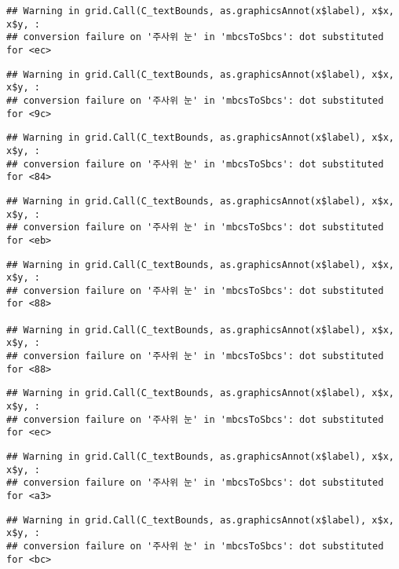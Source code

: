 \documentclass[]{book}
\begin{document}
\begin{verbatim}
## Warning in grid.Call(C_textBounds, as.graphicsAnnot(x$label), x$x, x$y, :
## conversion failure on '주사위 눈' in 'mbcsToSbcs': dot substituted for <ec>
\end{verbatim}

\begin{verbatim}
## Warning in grid.Call(C_textBounds, as.graphicsAnnot(x$label), x$x, x$y, :
## conversion failure on '주사위 눈' in 'mbcsToSbcs': dot substituted for <9c>
\end{verbatim}

\begin{verbatim}
## Warning in grid.Call(C_textBounds, as.graphicsAnnot(x$label), x$x, x$y, :
## conversion failure on '주사위 눈' in 'mbcsToSbcs': dot substituted for <84>
\end{verbatim}

\begin{verbatim}
## Warning in grid.Call(C_textBounds, as.graphicsAnnot(x$label), x$x, x$y, :
## conversion failure on '주사위 눈' in 'mbcsToSbcs': dot substituted for <eb>
\end{verbatim}

\begin{verbatim}
## Warning in grid.Call(C_textBounds, as.graphicsAnnot(x$label), x$x, x$y, :
## conversion failure on '주사위 눈' in 'mbcsToSbcs': dot substituted for <88>

## Warning in grid.Call(C_textBounds, as.graphicsAnnot(x$label), x$x, x$y, :
## conversion failure on '주사위 눈' in 'mbcsToSbcs': dot substituted for <88>
\end{verbatim}

\begin{verbatim}
## Warning in grid.Call(C_textBounds, as.graphicsAnnot(x$label), x$x, x$y, :
## conversion failure on '주사위 눈' in 'mbcsToSbcs': dot substituted for <ec>
\end{verbatim}

\begin{verbatim}
## Warning in grid.Call(C_textBounds, as.graphicsAnnot(x$label), x$x, x$y, :
## conversion failure on '주사위 눈' in 'mbcsToSbcs': dot substituted for <a3>
\end{verbatim}

\begin{verbatim}
## Warning in grid.Call(C_textBounds, as.graphicsAnnot(x$label), x$x, x$y, :
## conversion failure on '주사위 눈' in 'mbcsToSbcs': dot substituted for <bc>
\end{verbatim}
\end{document}
